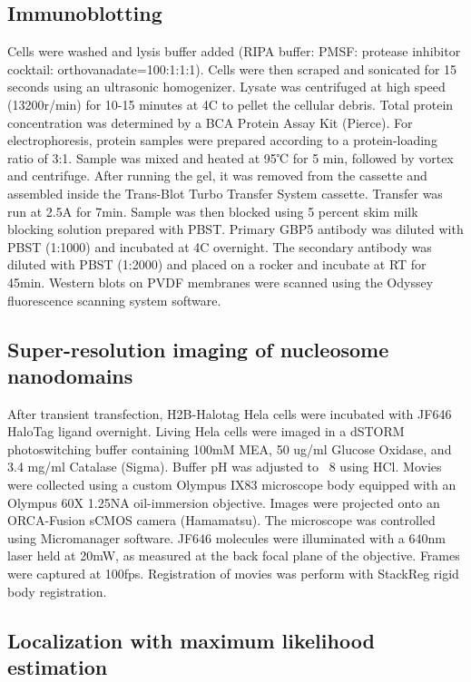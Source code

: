 \documentclass{ucetd}
\begin{document}
\subsection{Immunoblotting}

Cells were washed and lysis buffer added (RIPA buffer: PMSF: protease inhibitor cocktail: orthovanadate=100:1:1:1). Cells were then scraped and sonicated for 15 seconds using an ultrasonic homogenizer. Lysate was centrifuged at high speed (13200r/min) for 10-15 minutes at 4C to pellet the cellular debris. Total protein concentration was determined by a BCA Protein Assay Kit (Pierce). For electrophoresis, protein samples were prepared according to a protein-loading ratio of 3:1. Sample was mixed and heated at 95℃ for 5 min, followed by vortex and centrifuge. After running the gel, it was removed from the cassette and assembled inside the Trans-Blot Turbo Transfer System cassette. Transfer was run at 2.5A for 7min. Sample was then blocked using 5  percent  skim milk blocking solution prepared with PBST. Primary GBP5 antibody was diluted with PBST (1:1000) and incubated at 4C overnight. The secondary antibody was diluted with PBST (1:2000) and placed on a rocker and incubate at RT for 45min. Western blots on PVDF membranes were scanned using the Odyssey fluorescence scanning system software. 

\subsection{Super-resolution imaging of nucleosome nanodomains}

After transient transfection, H2B-Halotag Hela cells were incubated with JF646 HaloTag ligand overnight. Living Hela cells were imaged in a dSTORM photoswitching buffer containing 100mM MEA, 50 ug/ml Glucose Oxidase, and 3.4 mg/ml Catalase (Sigma). Buffer pH was adjusted to ~8 using HCl. Movies were collected using a custom Olympus IX83 microscope body equipped with an Olympus 60X 1.25NA oil-immersion objective. Images were projected onto an ORCA-Fusion sCMOS camera (Hamamatsu). The microscope was controlled using Micromanager software. JF646 molecules were illuminated with a 640nm laser held at 20mW, as measured at the back focal plane of the objective.  Frames were captured at 100fps. Registration of movies was perform with StackReg rigid body registration. 

\subsection{Localization with maximum likelihood estimation}
\end{document}

